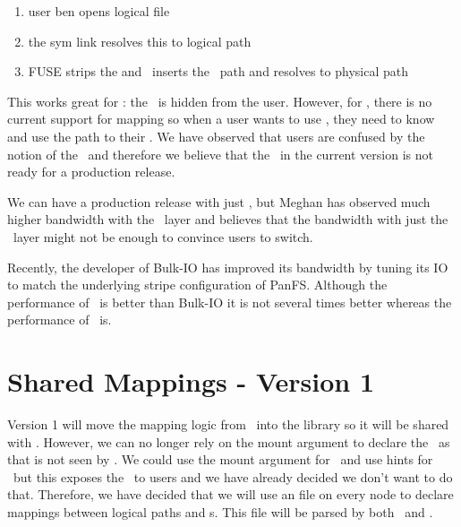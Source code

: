\documentclass[10pt]{article}
\begin{document}
\begin{enumerate}
\item{user ben opens logical file }
\item{the sym link resolves this to logical path 
        }
\item{FUSE strips the  and \plfs\ inserts the \store\ path 
        and resolves to physical path 
        }
\end{enumerate}

This works great for \fuse: the \store\ is hidden from the user.  However, for
\adio, there is no current support for mapping so when a user wants to use
\adio, they need to know and use the path to their \store.  We have observed
that users are confused by the notion of the \store\ and therefore we believe
that the \adio\ in the current version is not ready for a production release. 


We can have a production release with just \fuse, but Meghan has observed much
higher bandwidth with the \adio\ layer and believes that the bandwidth with 
just the \fuse\ layer might not be enough to convince users to switch.  


Recently, the developer of Bulk-IO has improved its bandwidth by tuning its 
IO to match the underlying stripe configuration of PanFS.  Although the
performance of \fuse\ is better than Bulk-IO it is not several times better
whereas the performance of \adio\ is. 


\section{Shared Mappings - Version 1}

Version 1 will move the mapping logic from \fuse\ into the library so it will
be shared with \adio.  However, we can no longer rely on the mount argument to
declare the \store\ as that is not seen by \adio.  We could use the mount
argument for \fuse\ and use hints for \adio\ but this exposes the \store\ to
users and we have already decided we don't want to do that.  Therefore, we have
decided that we will use an  file on every node to declare
mappings between logical paths and {\store}s.  This file will be parsed by both
\fuse\ and \adio.
\end{document}
